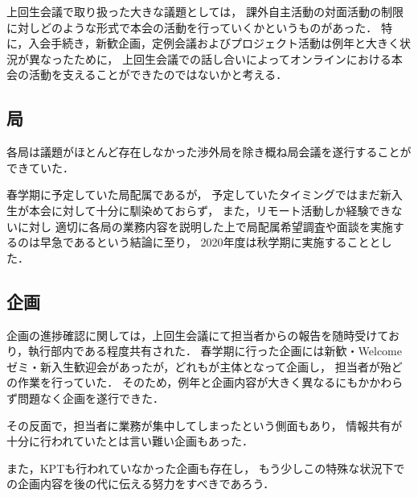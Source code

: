 上回生会議で取り扱った大きな議題としては，
課外自主活動の対面活動の制限に対しどのような形式で本会の活動を行っていくかというものがあった．
特に，入会手続き，新歓企画，定例会議およびプロジェクト活動は例年と大きく状況が異なったために，
上回生会議での話し合いによってオンラインにおける本会の活動を支えることができたのではないかと考える．

\subsection*{局}
各局は議題がほとんど存在しなかった渉外局を除き概ね局会議を遂行することができていた．

春学期に予定していた局配属であるが，
予定していたタイミングではまだ新入生が本会に対して十分に馴染めておらず，
また，リモート活動しか経験できない\firstGrade{}に対し
適切に各局の業務内容を説明した上で局配属希望調査や面談を実施するのは早急であるという結論に至り，
2020年度は秋学期に実施することとした．


\subsection*{企画}
企画の進捗確認に関しては，上回生会議にて担当者からの報告を随時受けており，執行部内である程度共有された．
春学期に行った企画には新歓・Welcomeゼミ・新入生歓迎会があったが，どれも\secondGrade{}が主体となって企画し，
担当者が殆どの作業を行っていた．
そのため，例年と企画内容が大きく異なるにもかかわらず問題なく企画を遂行できた．

その反面で，担当者に業務が集中してしまったという側面もあり，
情報共有が十分に行われていたとは言い難い企画もあった．

また，KPTも行われていなかった企画も存在し，
もう少しこの特殊な状況下での企画内容を後の代に伝える努力をすべきであろう．



